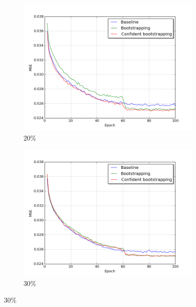 \begin{figure}[H]
\begin{subfigure}{0.31\textwidth}
\end{subfigure}
\hspace*{\fill} %
\begin{subfigure}{0.31\textwidth}
\includegraphics[width=\textwidth]{figs/E5/lc_2.png}
\caption{20\% } \label{fig:app_E5_2_lc}
\vspace{0.2cm} %
\end{subfigure}
\begin{subfigure}{0.31\textwidth}
\includegraphics[width=\textwidth]{figs/E5/lc_3.png}
\caption{ 30\%} \label{fig:app_E5_3_lc}
\vspace{0.2cm} %

\end{subfigure}
\end{figure}
